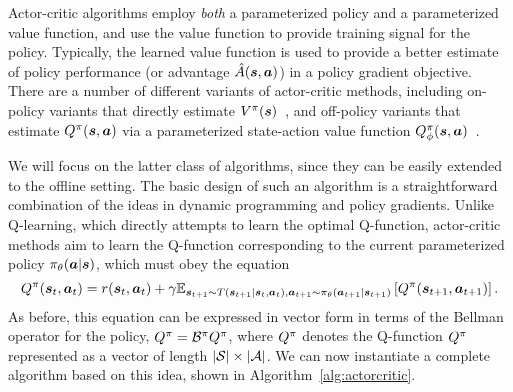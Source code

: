 \documentclass[../thesis.tex]{subfiles}
\begin{document}
Actor-critic algorithms employ \emph{both} a parameterized policy and a parameterized value function, and use the value function to provide training signal for the policy. Typically, the learned value function is used to provide a better estimate of policy performance (or advantage $\hat{A}(\boldsymbol{s},\boldsymbol{a})$) in a policy gradient objective. There are a number of different variants of actor-critic methods, including on-policy variants that directly estimate $V^\pi(\boldsymbol{s})$~\citep{konda2000actor}, and off-policy variants that estimate $Q^\pi(\boldsymbol{s},\boldsymbol{a})$ via a parameterized state-action value function $Q^\pi_\phi(\boldsymbol{s},\boldsymbol{a})$~\citep{haarnoja2018sac,haarnoja2017reinforcement,heess2015learning}. 

We will focus on the latter class of algorithms, since they can be easily extended to the offline setting. The basic design of such an algorithm is a straightforward combination of the ideas in dynamic programming and policy gradients. Unlike Q-learning, which directly attempts to learn the optimal Q-function, actor-critic methods aim to learn the Q-function corresponding to the current parameterized policy $\pi_\theta(\boldsymbol{a} | \boldsymbol{s})$, which must obey the equation
\[
Q^\pi(\boldsymbol{s}_t, \boldsymbol{a}_t) = r(\boldsymbol{s}_t,\boldsymbol{a}_t) + \gamma \mathbb{E}_{\boldsymbol{s}_{t+1} \sim T(\boldsymbol{s}_{t+1}|\boldsymbol{s}_t,\boldsymbol{a}_t), \boldsymbol{a}_{t+1} \sim \pi_\theta(\boldsymbol{a}_{t+1} | \boldsymbol{s}_{t+1})}\left[
Q^\pi(\boldsymbol{s}_{t+1},\boldsymbol{a}_{t+1})
\right].
\]
As before, this equation can be expressed in vector form in terms of the Bellman operator for the policy, ${Q}^\pi = \mathcal{B}^\pi {Q}^\pi$, where ${Q}^\pi$ denotes the Q-function $Q^\pi$ represented as a vector of length $|\mathcal{S}|\times |\mathcal{A}|$. We can now instantiate a complete algorithm based on this idea, shown in Algorithm~\ref{alg:actorcritic}.
\end{document}
